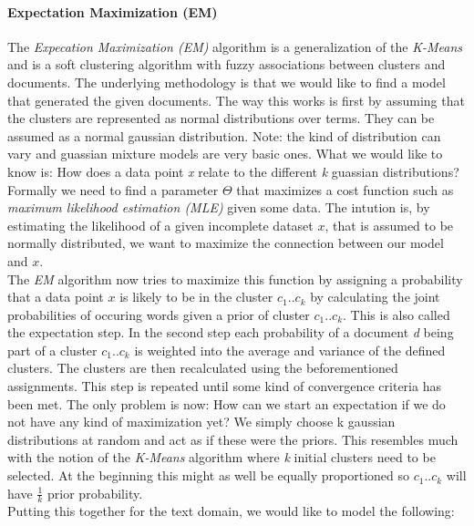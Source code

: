     \paragraph{Expectation Maximization (EM)}
    The \emph{Expecation Maximization (EM)} algorithm is a generalization of the \emph{K-Means} and is a soft clustering algorithm with fuzzy associations between clusters and documents. The underlying methodology is that we would like to find a model that generated the given documents. The way this works is first by assuming that the clusters are represented as normal distributions over terms. They can be assumed as a normal gaussian distribution. Note: the kind of distribution can vary and guassian mixture models are very basic ones. What we would like to know is: How does a data point \emph{x} relate to the different \emph{k} guassian distributions? Formally we need to find a parameter $\Theta$ that maximizes a cost function such as \emph{maximum likelihood estimation (MLE)} given some data. The intution is, by estimating the likelihood of a given incomplete dataset $x$, that is assumed to be normally distributed, we want to maximize the connection between our model and $x$.\\
    The \emph{EM} algorithm now tries to maximize this function by assigning a probability that a data point $x$ is likely to be in the cluster $c_1..c_k$ by calculating the joint probabilities of occuring words given a prior of cluster $c_1..c_k$. This is also called the expectation step. In the second step each probability of a document \emph{d} being part of a cluster $c_1..c_k$ is weighted into the average and variance of the defined clusters. The clusters are then recalculated using the beforementioned assignments. This step is repeated until some kind of convergence criteria has been met. The only problem is now: How can we start an expectation if we do not have any kind of maximization yet? We simply choose k gaussian distributions at random and act as if these were the priors. This resembles much with the notion of the \emph{K-Means} algorithm where \emph{k} initial clusters need to be selected. At the beginning this might as well be equally proportioned so $c_1..c_k$ will have $\frac{1}{k}$ prior probability.\\
    Putting this together for the text domain, we would like to model the following:

